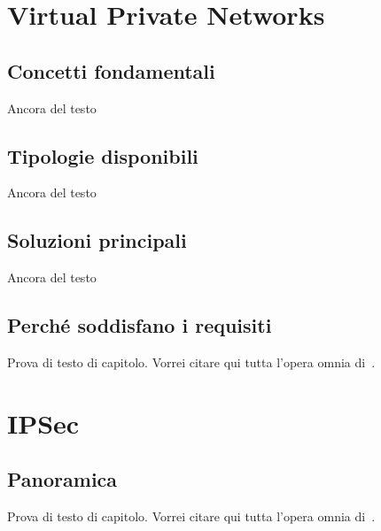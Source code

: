 \section{Virtual Private Networks }

\subsection{Concetti fondamentali}
Ancora del testo

\subsection{Tipologie disponibili}
Ancora del testo

\subsection{Soluzioni principali}
Ancora del testo

\subsection{Perché soddisfano i requisiti}
Prova di testo di capitolo. Vorrei citare qui tutta l'opera omnia di~\cite{IEEE:1990,WIKI:INTEROP,BOX:1997,AHL:1996}.



\section{IPSec}
\subsection{Panoramica}
Prova di testo di capitolo. Vorrei citare qui tutta l'opera omnia di~\cite{IEEE:1990,WIKI:INTEROP,BOX:1997,AHL:1996}.

